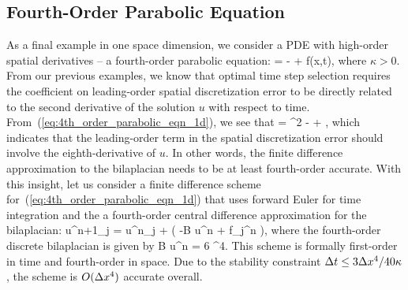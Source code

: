 \documentclass[oneeqnum,onefignum,onetabnum,onethmnum]{siamltex}
\begin{document}
\subsection{Fourth-Order Parabolic Equation}
As a final example in one space dimension, we consider a PDE with high-order
spatial derivatives -- a fourth-order parabolic equation: 
\beq
   = -\kappa {} + f(x,t), 
  \label{eq:4th_order_parabolic_eqn_1d}
\eeq
where $\kappa > 0$.
From our previous examples, we know that optimal time step selection requires 
the coefficient on leading-order spatial discretization error to be directly 
related to the second derivative of the solution $u$ with respect to time.  
From~(\ref{eq:4th_order_parabolic_eqn_1d}), we see that 
\beq
   = 
    \kappa^2  
  - \kappa {} 
  + 
  \label{eq:4th_order_parabolic_eqn_1d_second_time_derivative},
\eeq
which indicates that the leading-order term in the spatial discretization 
error should involve the eighth-derivative of $u$.  In other words, the
finite difference approximation to the bilaplacian needs to be at least 
fourth-order accurate.  With this insight, let us consider a finite 
difference scheme for~(\ref{eq:4th_order_parabolic_eqn_1d}) that 
uses forward Euler for time integration and the a fourth-order central 
difference approximation for the bilaplacian:
\bea
  u^{n+1}_j = u^{n}_j + \dt \left( -\kappa B u^n + f_j^n \right), 
  \label{eq:4th_order_parabolic_eqn_1d_FD_scheme}
\eea
where the fourth-order discrete bilaplacian is given by
\beq
  B u^n = 
               {6 \dx^4}.
\eeq
This scheme is formally first-order in time and fourth-order in space.  
Due to the stability constraint $\Delta t \le 3\Delta x^4/40 \kappa$, the scheme is 
$O(\Delta x^4)$ accurate overall.
\end{document}
